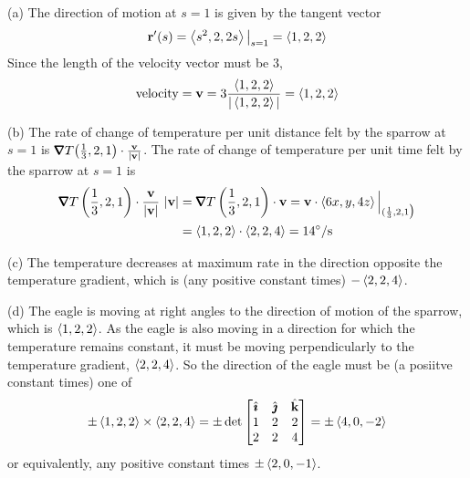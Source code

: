 \begin{solution}
(a) The direction of motion at $s=1$ is given by the tangent vector
\begin{equation*}
\mathbf{r}'(s)=\left< s^2,2,2s\right>\big|_{s=1}=\left< 1,2,2\right>
\end{equation*}
Since the length of the velocity vector must be $3$,
\begin{equation*}
\text{velocity}=\mathbf{v}=3\frac{\left< 1,2,2\right>}{|\left< 1,2,2\right>|}=\left< 1,2,2\right>
\end{equation*}

(b) The rate of change of temperature per unit distance felt by the 
sparrow at $s=1$ is $\vnabla T\big(\frac{1}{3},2,1\big)\cdot\frac{\vv}{|\vv|}$.
 The rate of change of temperature per unit time felt by the 
sparrow at $s=1$ is
\begin{align*}
\vnabla T\left(\frac{1}{3},2,1\right)\cdot\frac{\vv}{|\vv|}\ |\vv|
&=\vnabla T\left(\frac{1}{3},2,1\right)\cdot\vv
=\vv\cdot\llt 6x,y,4z\rgt\Big|_{({1\over3},2,1\big)} \\
&=\llt 1,2,2\rgt\cdot\llt 2,2,4\rgt=14^\circ/{\rm s}
\end{align*}

(c) The temperature decreases at maximum rate in the direction
opposite the temperature gradient, which is (any positive constant times) $-\left< 2,2,4\right>$.

(d) The eagle is moving at right angles to the direction of motion
of the sparrow, which is $\left< 1,2,2\right>$. As the eagle is also moving 
in a direction for which the temperature remains constant, it must 
be moving perpendicularly to the temperature gradient, $\left< 2,2,4\right>$. 
So the direction of the eagle must be (a posiitve constant times) 
one of
\begin{align*}
   \pm\left< 1,2,2\right> \times\left< 2,2,4\right>
=\pm\det\left[\begin{matrix}
                     \hat{\pmb{\imath}} & \hat{\pmb{\jmath}} & \hat{\mathbf{k}} \\
                     1   &  2  & 2 \\
                     2   &  2  & 4
                \end{matrix}\right]
=\pm\left< 4,0,-2\right>
\end{align*}
or equivalently, any positive constant times $\pm\left< 2,0,-1\right>$.
\end{solution}

